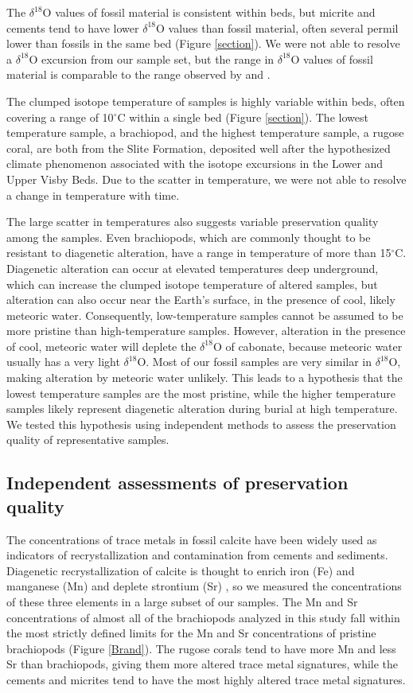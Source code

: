 \documentclass{article}
\newcommand{\deltao}{$\delta^{18}$}
\newcommand{\degrees}{$^{\circ}$}
\begin{document}
The \deltao O values of fossil material is consistent within beds, but micrite and cements tend to have lower \deltao O values than fossil material, often several permil lower than fossils in the same bed (Figure \ref{section}). We were not able to resolve a \deltao O excursion from our sample set, but the range in \deltao O values of fossil material is comparable to the range observed by \cite{Bickert1997} and \cite{Munnecke2003}. 

The clumped isotope temperature of samples is highly variable within beds, often covering a range of 10\degrees C within a single bed (Figure \ref{section}). The lowest temperature sample, a brachiopod, and the highest temperature sample, a rugose coral, are both from the Slite Formation, deposited well after the hypothesized climate phenomenon associated with the isotope excursions in the Lower and Upper Visby Beds. Due to the scatter in temperature, we were not able to resolve a change in temperature with time. 

The large scatter in temperatures also suggests variable preservation quality among the samples. Even brachiopods, which are commonly thought to be resistant to diagenetic alteration, have a range in temperature of more than 15\degrees C. Diagenetic alteration can occur at elevated temperatures deep underground, which can increase the clumped isotope temperature of altered samples, but alteration can also occur near the Earth's surface, in the presence of cool, likely meteoric water. Consequently, low-temperature samples cannot be assumed to be more pristine than high-temperature samples. However, alteration in the presence of cool, meteoric water will deplete the \deltao O of cabonate, because meteoric water usually has a very light \deltao O. Most of our fossil samples are very similar in \deltao O, making alteration by meteoric water unlikely. This leads to a hypothesis that the lowest temperature samples are the most pristine, while the higher temperature samples likely represent diagenetic alteration during burial at high temperature. We tested this hypothesis using independent methods to assess the preservation quality of representative samples. 

\subsection{Independent assessments of preservation quality}

The concentrations of trace metals in fossil calcite have been widely used as indicators of recrystallization and contamination from cements and sediments. Diagenetic recrystallization of calcite is thought to enrich iron (Fe) and manganese (Mn) and deplete strontium (Sr) \citep{Brand1980,Shields2003}, so we measured the concentrations of these three elements in a large subset of our samples. The Mn and Sr concentrations of almost all of the brachiopods analyzed in this study fall within the most strictly defined limits for the Mn and Sr concentrations of pristine brachiopods (Figure \ref{Brand}). The rugose corals tend to have more Mn and less Sr than brachiopods, giving them more altered trace metal signatures, while the cements and micrites tend to have the most highly altered trace metal signatures. 
\end{document}
